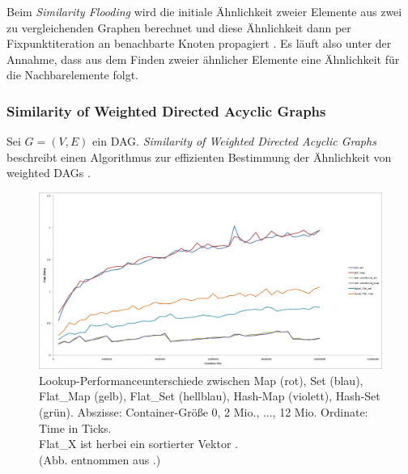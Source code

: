Beim \textit{Similarity Flooding} wird die initiale Ähnlichkeit zweier Elemente aus zwei zu vergleichenden Graphen berechnet und diese Ähnlichkeit dann per Fixpunktiteration an benachbarte Knoten propagiert \cite{S.Melnik.2002}. Es läuft also unter der Annahme, dass aus dem Finden zweier ähnlicher Elemente eine Ähnlichkeit für die Nachbarelemente folgt. 

\subsubsection{Similarity of Weighted Directed Acyclic Graphs} \label{sec:sim_dag}

Sei $G = (V, E)$ ein \ac{DAG}. \textit{Similarity of Weighted Directed Acyclic Graphs} beschreibt einen Algorithmus zur effizienten Bestimmung der Ähnlichkeit von weighted \acp{DAG} \cite{Jin.2004}.
 
\begin{figure}
	\centering
	\includegraphics[width=\textwidth]{Bilder/GCC_timings_10M.jpg} 
	\caption{Lookup-Performanceunterschiede zwischen Map (rot), Set (blau), Flat\_Map (gelb), Flat\_Set (hellblau), Hash-Map (violett), Hash-Set (grün). Abszisse: Container-Größe 0, 2 Mio., ..., 12 Mio. Ordinate: Time in Ticks.\\ Flat\_X ist herbei ein sortierter Vektor \cite{.20220811}.\\ (Abb. entnommen aus \cite{.20220819b}.)}
	\label{fig:container_perf}
\end{figure} 
